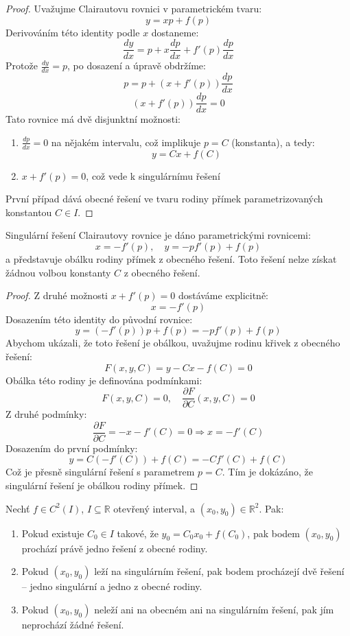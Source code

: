 \begin{proof}
Uvažujme Clairautovu rovnici v parametrickém tvaru:
\[
y = xp + f(p)
\]
Derivováním této identity podle $x$ dostaneme:
\[
\frac{dy}{dx} = p + x\frac{dp}{dx} + f'(p)\frac{dp}{dx}
\]
Protože $\frac{dy}{dx} = p$, po dosazení a úpravě obdržíme:
\[
p = p + (x + f'(p))\frac{dp}{dx}
\]
\[
(x + f'(p))\frac{dp}{dx} = 0
\]
Tato rovnice má dvě disjunktní možnosti:
\begin{enumerate}
\item $\frac{dp}{dx} = 0$ na nějakém intervalu, což implikuje $p = C$ (konstanta), a tedy:
\[
y = Cx + f(C)
\]
\item $x + f'(p) = 0$, což vede k singulárnímu řešení
\end{enumerate}
První případ dává obecné řešení ve tvaru rodiny přímek parametrizovaných konstantou $C \in I$.
\end{proof}

\begin{theorem}
Singulární řešení Clairautovy rovnice je dáno parametrickými rovnicemi:
\[
x = -f'(p), \quad y = -pf'(p) + f(p)
\]
a představuje obálku rodiny přímek z obecného řešení. Toto řešení nelze získat žádnou volbou konstanty $C$ z obecného řešení.
\end{theorem}

\begin{proof}
Z druhé možnosti $x + f'(p) = 0$ dostáváme explicitně:
\[
x = -f'(p)
\]
Dosazením této identity do původní rovnice:
\[
y = (-f'(p))p + f(p) = -pf'(p) + f(p)
\]
Abychom ukázali, že toto řešení je obálkou, uvažujme rodinu křivek z obecného řešení:
\[
F(x, y, C) = y - Cx - f(C) = 0
\]
Obálka této rodiny je definována podmínkami:
\[
F(x, y, C) = 0, \quad \frac{\partial F}{\partial C}(x, y, C) = 0
\]
Z druhé podmínky:
\[
\frac{\partial F}{\partial C} = -x - f'(C) = 0 \Rightarrow x = -f'(C)
\]
Dosazením do první podmínky:
\[
y = C(-f'(C)) + f(C) = -Cf'(C) + f(C)
\]
Což je přesně singulární řešení s parametrem $p = C$. Tím je dokázáno, že singulární řešení je obálkou rodiny přímek.
\end{proof}

\begin{theorem}
Nechť $f \in C^2(I)$, $I \subseteq \mathbb{R}$ otevřený interval, a $(x_0, y_0) \in \mathbb{R}^2$. Pak:
\begin{enumerate}
\item Pokud existuje $C_0 \in I$ takové, že $y_0 = C_0x_0 + f(C_0)$, pak bodem $(x_0, y_0)$ prochází právě jedno řešení z obecné rodiny.
\item Pokud $(x_0, y_0)$ leží na singulárním řešení, pak bodem procházejí dvě řešení -- jedno singulární a jedno z obecné rodiny.
\item Pokud $(x_0, y_0)$ neleží ani na obecném ani na singulárním řešení, pak jím neprochází žádné řešení.
\end{enumerate}
\end{theorem}

